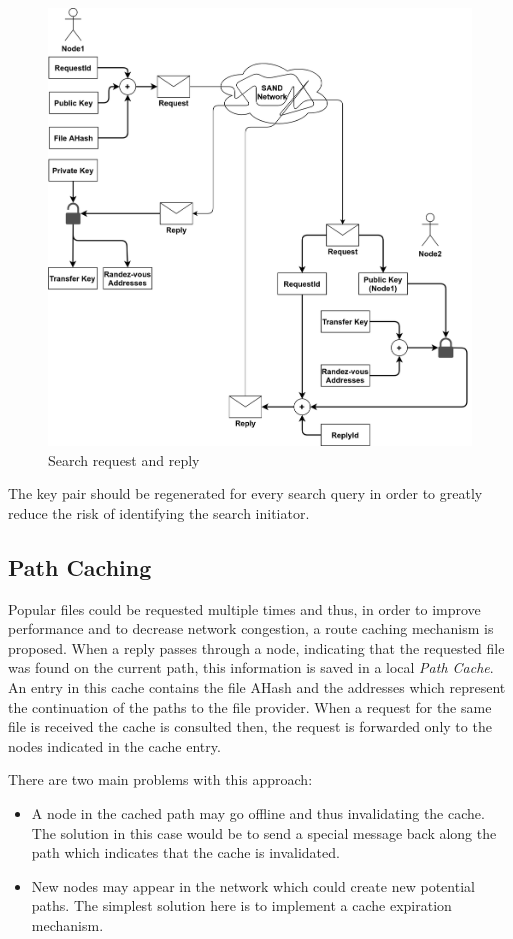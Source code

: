 \begin{figure}
    \centering
    \includegraphics[width=\textwidth]{figures/fig5}
    \caption{Search request and reply}
    \label{fig:fig5}
\end{figure}

The key pair should be regenerated for every search query in order to greatly 
reduce the risk of identifying the search initiator.

\subsection{Path Caching}

Popular files could be requested multiple times and thus, in order to improve 
performance and to decrease network congestion, a route caching mechanism is 
proposed. When a reply passes through a node, indicating that the requested 
file was found on the current path, this information is saved in a local 
\textit{Path Cache}. An entry in this cache contains the file AHash and the 
addresses which represent the continuation of the paths to the file provider. 
When a request for the same file is received the cache is consulted then, the 
request is forwarded only to the nodes indicated in the cache entry.

There are two main problems with this approach:
\begin{itemize}
    \item A node in the cached path may go offline and thus invalidating the 
cache. The solution in this case would be to send a special message back along 
the path which indicates that the cache is invalidated.
    \item New nodes may appear in the network which could create new potential 
paths. The simplest solution here is to implement a cache expiration mechanism.
\end{itemize}

